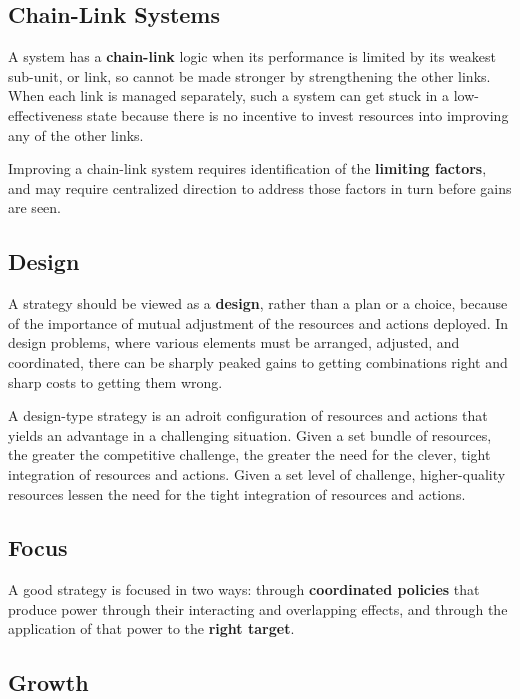 \documentclass{article}
\begin{document}
\begin{multicols}{2}
\subsection{Chain-Link Systems}

A system has a \textbf{chain-link} logic when its performance is limited by its weakest sub-unit, or link, so cannot be made stronger by strengthening the other links. When each link is managed separately, such a system can get stuck in a low-effectiveness state because there is no incentive to invest resources into improving any of the other links.

Improving a chain-link system requires identification of the \textbf{limiting factors}, and may require centralized direction to address those factors in turn before gains are seen.

\subsection{Design}

A strategy should be viewed as a \textbf{design}, rather than a plan or a choice, because of the importance of mutual adjustment of the resources and actions deployed. In design problems, where various elements must be arranged, adjusted, and coordinated, there can be sharply peaked gains to getting combinations right and sharp costs to getting them wrong.

A design-type strategy is an adroit configuration of resources and actions that yields an advantage in a challenging situation. Given a set bundle of resources, the greater the competitive challenge, the greater the need for the clever, tight integration of resources and actions. Given a set level of challenge, higher-quality resources lessen the need for the tight integration of resources and actions.

\subsection{Focus}

A good strategy is focused in two ways: through \textbf{coordinated policies} that produce power through their interacting and overlapping effects, and through the application of that power to the \textbf{right target}.

\subsection{Growth}


\end{multicols}
\end{document}
